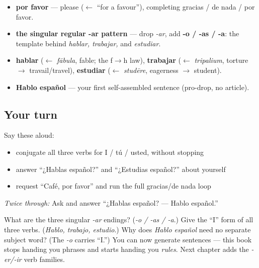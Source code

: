 \begin{grammarlens}[title={What you've built this chapter}]
\begin{itemize}
\raggedright
  \item \textbf{por favor} — please ($\leftarrow$ \textquotedblleft{}for a favour\textquotedblright{}), completing gracias / de nada / por favor.
  \item \textbf{the singular regular -ar pattern} — drop \emph{-ar}, add \textbf{-o / -as / -a}: the template behind \emph{hablar, trabajar,} and \emph{estudiar}.
  \item \textbf{hablar} ($\leftarrow$ \emph{fābula}, fable; the f$\to$h law), \textbf{trabajar} ($\leftarrow$ \emph{tripalium}, torture $\to$ travail/travel), \textbf{estudiar} ($\leftarrow$ \emph{studēre}, eagerness $\to$ student).
  \item \textbf{Hablo español} — your first self-assembled sentence (pro-drop, no article).
\end{itemize}
\end{grammarlens}

\subsection*{Your turn}
Say these aloud:

\begin{itemize}
\raggedright
  \item conjugate all three verbs for I / tú / usted, without stopping
  \item answer “¿Hablas español?” and “¿Estudias español?” about yourself
  \item request “Café, por favor” and run the full gracias/de nada loop
\end{itemize}

\emph{Twice through:} Ask and answer “¿Hablas español? — Hablo español.”

\begin{tcolorbox}[breakable,colback=teal!4,colframe=teal!35!black,title={Before you move on}]
What are the three singular \emph{-ar} endings? (\emph{-o / -as / -a}.) Give the “I” form of all three verbs. (\emph{Hablo, trabajo, estudio}.) Why does \emph{Hablo español} need no separate subject word? (The \emph{-o} carries “I.”) You can now generate sentences — this book stops handing you phrases and starts handing you \emph{rules}. Next chapter adds the \emph{-er/-ir} verb families.
\end{tcolorbox}
